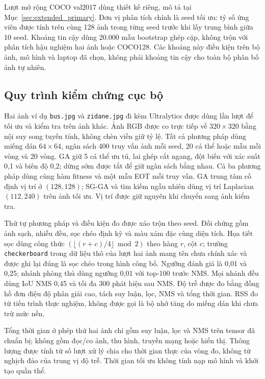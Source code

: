 \documentclass[a4paper,fleqn]{cas-dc}
\begin{document}
Lượt mở rộng COCO val2017 dùng thiết kế riêng, mô tả tại Mục~\ref{sec:extended_primary}. Đơn vị phân tích chính là seed tối ưu: tỷ số ứng viên được tính trên cùng 128 ảnh trong từng seed trước khi lấy trung bình giữa 10 seed. Khoảng tin cậy dùng 20.000 mẫu bootstrap ghép cặp, không trộn với phân tích hậu nghiệm hai ảnh hoặc COCO128. Các khoảng này điều kiện trên bộ ảnh, mô hình và laptop đã chọn, không phải khoảng tin cậy cho toàn bộ phân bố ảnh tự nhiên.


\subsection{Quy trình kiểm chứng cục bộ}

Hai ảnh ví dụ \texttt{bus.jpg} và \texttt{zidane.jpg} đi kèm Ultralytics được dùng lần lượt để tối ưu và kiểm tra trên ảnh khác. Ảnh RGB được co trực tiếp về $320\times320$ bằng nội suy song tuyến tính, không chèn viền giữ tỷ lệ. Tất cả phương pháp dùng miếng dán $64\times64$, ngân sách 400 truy vấn ảnh mỗi seed, 20 cá thể hoặc mẫu mỗi vòng và 20 vòng. GA giữ 5 cá thể ưu tú, lai ghép cắt ngang, đột biến với xác suất 0,1 và biên độ 0,2; dừng sớm được tắt để giữ ngân sách bằng nhau. Cả ba phương pháp dùng cùng hàm fitness và một mẫu EOT mỗi truy vấn. GA trung tâm cố định vị trí ở $(128,128)$; SG-GA và tìm kiếm ngẫu nhiên dùng vị trí Laplacian $(112,240)$ trên ảnh tối ưu. Vị trí được giữ nguyên khi chuyển sang ảnh kiểm tra.

Thứ tự phương pháp và điều kiện đo được xáo trộn theo seed. Đối chứng gồm ảnh sạch, nhiễu đều, sọc chéo định kỳ và màu xám đặc cùng diện tích. Họa tiết sọc dùng công thức $(\lfloor(r+c)/4\rfloor\bmod2)$ theo hàng $r$, cột $c$; trường \texttt{checkerboard} trong dữ liệu thô của lượt hai ảnh mang tên chưa chính xác và được ghi lại đúng là sọc chéo trong hình công bố. Ngưỡng đánh giá là 0,01 và 0,25; nhánh phòng thủ dùng ngưỡng 0,01 với top-100 trước NMS. Mọi nhánh đều dùng IoU NMS 0,45 và tối đa 300 phát hiện sau NMS. Độ trễ được đo bằng đồng hồ đơn điệu độ phân giải cao, tách suy luận, lọc, NMS và tổng thời gian. RSS đo từ tiến trình thực nghiệm, không được gọi là bộ nhớ tăng do miếng dán khi chưa trừ mức nền.

Tổng thời gian ở phép thử hai ảnh chỉ gồm suy luận, lọc và NMS trên tensor đã chuẩn bị; không gồm đọc/co ảnh, thu hình, truyền mạng hoặc hiển thị. Thông lượng được tính từ số lượt xử lý chia cho thời gian thực của vòng đo, không từ nghịch đảo của trung vị độ trễ. Thời gian tối ưu không tính nạp mô hình và khởi tạo quần thể.
\end{document}
